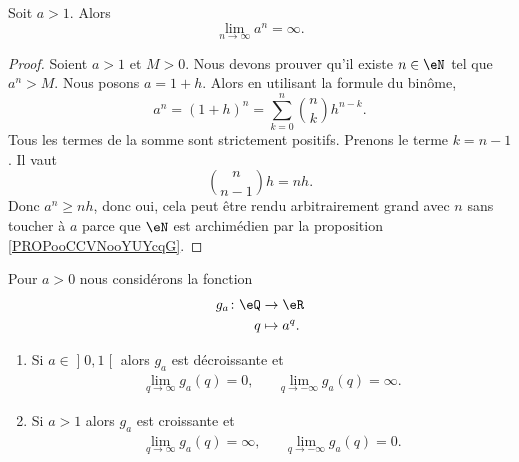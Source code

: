 \begin{proposition}\label{PROPooVXKBooQPPjMn}
    Soit \( a>1\). Alors
    \begin{equation}
        \lim_{n\to \infty} a^n=\infty.
    \end{equation}
\end{proposition}

\begin{proof}
    Soient \( a>1\) et  \( M>0\). Nous devons prouver qu'il existe \( n\in \eN\) tel que \( a^n>M\). Nous posons \( a=1+h\). Alors en utilisant la formule du binôme, 
    \begin{equation}
        a^n=(1+h)^n=\sum_{k=0}^n{n\choose k}h^{n-k}.
    \end{equation}
    Tous les termes de la somme sont strictement positifs. Prenons le terme \( k=n-1\). Il vaut
    \begin{equation}
        {n\choose n-1}h=nh.
    \end{equation}
    Donc \( a^n\geq nh\), donc oui, cela peut être rendu arbitrairement grand avec \( n\) sans toucher à \( a\) parce que \( \eN\) est archimédien par la proposition \ref{PROPooCCVNooYUYcqG}.
\end{proof}

\begin{proposition}      \label{PROPooGCBZooTcyGtO}
    Pour \( a>0\) nous considérons la fonction
    \begin{equation}
        \begin{aligned}
            g_a\colon \eQ&\to \eR \\
            q&\mapsto a^q.
        \end{aligned}
    \end{equation}
    \begin{enumerate}
        \item
            Si \( a\in \mathopen] 0 , 1 \mathclose[\) alors \( g_a\) est décroissante et
            \begin{subequations}
                \begin{align}
                    \lim_{q\to \infty} g_a(q)=0,&& \lim_{q\to -\infty} g_a(q)=\infty.
                \end{align}
           \end{subequations}
       \item      \label{ITEMooGOEVooKVoVpZ}
            Si \( a>1\)  alors \( g_a\) est croissante et
            \begin{subequations}
                \begin{align}
                    \lim_{q\to \infty} g_a(q)=\infty,&& \lim_{q\to -\infty} g_a(q)=0.
                \end{align}
           \end{subequations}
    \end{enumerate}
\end{proposition}


